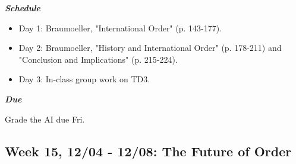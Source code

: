\documentclass[11pt,]{article}
\begin{document}
\begin{multicols}{2}

\textbf{\textit{Schedule}}

\begin{itemize}

\item Day 1: Braumoeller, "International Order" (p. 143-177).

\item Day 2: Braumoeller, "History and International Order" (p. 178-211) and "Conclusion and Implications" (p. 215-224).

\item Day 3: In-class group work on TD3.

\end{itemize}

\columnbreak

\begin{flushright}

\textbf{\textit{Due}}

Grade the AI due Fri.

\end{flushright}

\end{multicols}

\hypertarget{week-15-1204---1208-the-future-of-order}{%
\subsection{Week 15, 12/04 - 12/08: The Future of
Order}\label{week-15-1204---1208-the-future-of-order}}
\end{document}
